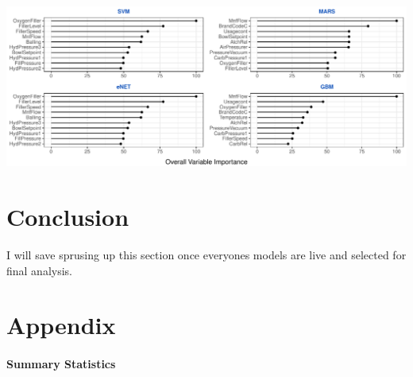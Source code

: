 \documentclass[]{report}
\begin{document}
\includegraphics{Proj2-JM_files/figure-latex/unnamed-chunk-12-1.pdf}

\hypertarget{conclusion}{%
\chapter{Conclusion}\label{conclusion}}

I will save sprusing up this section once everyones models are live and
selected for final analysis.

\hypertarget{Appendix}{%
\chapter*{Appendix}\label{Appendix}}

\hypertarget{summary-statistics}{%
\subsubsection{Summary Statistics}\label{summary-statistics}}
\end{document}
